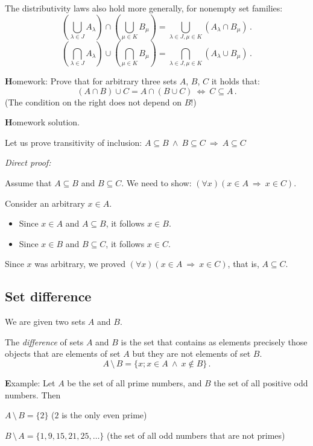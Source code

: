 \documentclass[11pt,paper=b5,footinclude,headinclude]{scrbook} %
\def\inn {{~\wedge~}}
\def\sledi {{~\Rightarrow~}}
\def\brez {{\,\setminus\,}}
\def\cee {{~\Leftrightarrow~}}
\theoremstyle{remark}
\theoremstyle{definition} %
\begin{document}
The distributivity laws also hold more generally, for nonempty set families:
$$(\bigcup_{\lambda\in J}A_\lambda)\cap (\bigcup_{\mu\in K}B_\mu) =
\bigcup_{\lambda\in J, \mu\in K}(A_\lambda\cap B_\mu)\,.$$
$$(\bigcap_{\lambda\in J}A_\lambda)\cup (\bigcap_{\mu\in K}B_\mu) =
\bigcap_{\lambda\in J, \mu\in K}(A_\lambda\cup B_\mu)\,.$$

\medskip
{\textbf Homework:} Prove that for arbitrary three sets $A$, $B$, $C$ it holds that:
$$(A\cap B)\cup C = A\cap (B\cup C) \cee C\subseteq A\,.$$
(The condition on the right does not depend on $B$!)


\bigskip
{\textbf Homework solution.}

Let us prove transitivity of inclusion: $A\subseteq B \inn B\subseteq C \sledi A \subseteq C$

{\em Direct proof:}

Assume that $A\subseteq B$ and $B\subseteq C$.
We need to show: $(\forall x)(x\in A\sledi x\in C)$.

Consider an arbitrary $x\in A$.
\begin{itemize}
  \item Since $x\in A$ and $A\subseteq B$, it follows $x\in B$.
  \item Since $x\in B$ and $B\subseteq C$, it follows $x\in C$.
\end{itemize}
Since $x$ was arbitrary, we proved $(\forall x)(x\in A\sledi x\in C)$, that is, $A\subseteq C$.

\bigskip

\subsection{Set difference}

We are given two sets $A$ and $B$.

The {\em difference}  of sets $A$ and $B$ is the set that contains as elements precisely those objects that are elements of set $A$ but they are not elements of set $B$.
$$A\brez B = \{x; x\in A\inn x\not\in B\}\,.$$

{\textbf Example:}
Let $A$ be the set of all prime numbers, and $B$ the set of all positive odd numbers.
Then

$A\brez B = \{2\}$ ($2$ is the only even prime)

$B\brez A = \{1,9,15,21,25,\ldots\}$ (the set of all odd numbers that are not primes)

\bigskip
\end{document}
